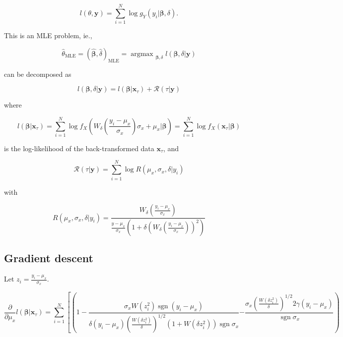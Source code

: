 \documentclass[8pt,oneside]{extbook}
\newcommand{\vect}[1]{\boldsymbol{#1}}
\DeclareMathOperator*{\sgn}{sgn}
\DeclareMathOperator*{\argmax}{argmax\:}
\begin{document}
\begin{equation}\label{eq:mle}
    l(\theta,\vect{y})=
    \sum_{i=1}^N\log g_Y(y_i|\vect{\beta},\delta).
\end{equation}

This is an MLE problem, ie.,

\begin{equation}
    \hat{\theta}_{\mathrm{MLE}}=\left(\hat{\vect{\beta}},\hat{\delta}\right)
    _{\mathrm{MLE}}=
    \argmax_{\vect{\beta},\delta}
    l\left(\vect{\beta},\delta\big|\vect{y}\right)
\end{equation}

 can be decomposed as

\begin{equation}
    l\left(\vect{\beta},\delta\big|\vect{y}\right)=
    l(\vect{\beta}\big|\vect{x}_\tau)
    +\mathcal{R}(\tau\big|\vect{y})
\end{equation}

where

\begin{equation}
    l(\vect{\beta}|\vect{x}_\tau)
    =
    \sum_{i=1}^N\log f_X\left(W_\delta\left(\frac{y_i-\mu_x}{\sigma_x}\right)
    \sigma_x +\mu_x\big|\vect{\beta}\right)
    =
\sum_{i=1}^N\log f_X\left(\vect{x}_\tau|\vect{\beta}\right)
\end{equation}

is the log-likelihood of the back-transformed data $\vect{x}_\tau$, and

\begin{equation}
    \mathcal{R}(\tau\big|\vect{y})
    =
\sum_{i=1}^N\log R\left(\mu_x,\sigma_x,\delta\big|y_i\right)
\end{equation}

with

\begin{equation}
    R(\mu_x,\sigma_x,\delta|y_i)
    =
    \frac{W_\delta\left(\frac{y_i-\mu_x}{\sigma_x}\right)}
    {\frac{y-\mu_x}{\sigma_x}\left(
            1+\delta\left(W_\delta\left(\frac{y_i-\mu_x}{\sigma_x}\right)\right)^2
    \right)}
\end{equation}

\subsection{Gradient descent}

Let $z_i=\frac{y_i-\mu_x}{\sigma_x}$.

$$
\frac{\partial}{\partial \mu_x}l(\vect{\beta}|\vect{x}_\tau)
=
\sum_{i=1}^N\left[
\left(1-\frac{\sigma_x W(z_i^2)\sgn(y_i-\mu_x)}
    {
        \delta(y_i-\mu_x)\left(\frac{W(\delta z_i^2)}{\delta}\right)^{1/2}
        \left(1+W(\delta z_i^2)\right)\sgn\sigma_x
    }
    {
-
\frac{\sigma_x\left(\frac{W(\delta z_i^2)}{\delta}\right)^{1/2}
    2\gamma(y_i-\mu_x)
}{\sgn \sigma_x}
    }
    \right)\right.
$$
\end{document}
